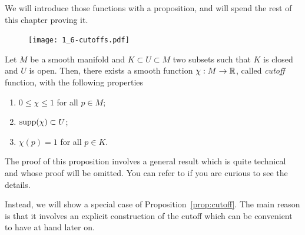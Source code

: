 We will introduce those functions with a proposition, and will spend the rest of this chapter proving it.

\begin{figure}[htp!]
  \texttt{[image: 1\_6-cutoffs.pdf]}
\end{figure}

\begin{proposition}\label{prop:cutoff}
  Let $M$ be a smooth manifold and $K\subset U\subset M$ two subsets such that $K$ is closed and $U$ is open.
  Then, there exists a smooth function $\chi: M \to\mathbb{R}$, called \emph{cutoff} function, with the following properties
  \begin{enumerate}
    \item $0 \leq \chi \leq 1$ for all $p\in M$;
    \item $\operatorname{supp}(\chi)\subset U$;
    \item $\chi(p) = 1$ for all $p\in K$.
  \end{enumerate}
\end{proposition}

The proof of this proposition involves a general result which is quite technical and whose proof will be omitted.
You can refer to \cite{book:lee, book:tu} if you are curious to see the details.

Instead, we will show a special case of Proposition~\ref{prop:cutoff}. The main reason is that it involves an explicit construction of the cutoff which can be convenient to have at hand later on.

